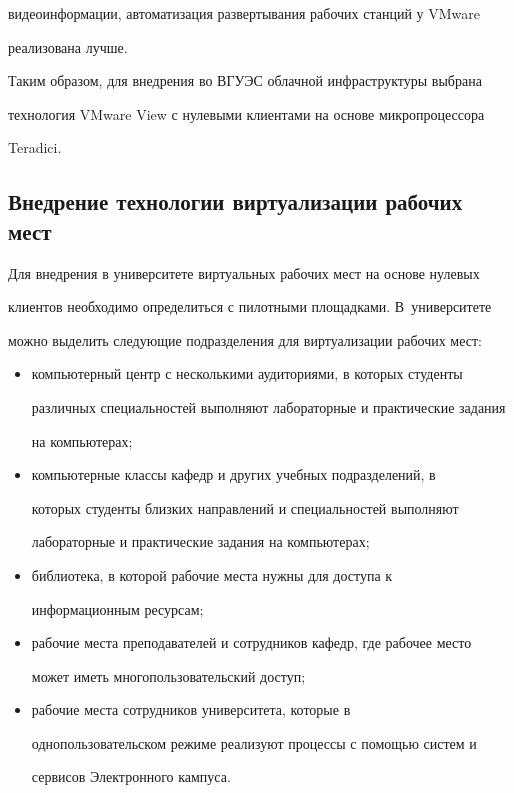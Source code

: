 видеоинформации, автоматизация развертывания рабочих станций у VMware 

реализована лучше. 

  

  Таким образом, для внедрения во ВГУЭС облачной инфраструктуры выбрана 

технология VMware View с нулевыми клиентами на основе микропроцессора 

Teradici. 



\subsection{Внедрение технологии виртуализации рабочих мест }



  Для внедрения в университете виртуальных рабочих мест на основе нулевых 

клиентов необходимо определиться с пилотными площадками. В~университете 

можно выделить следующие подразделения для виртуализации рабочих мест: 

  \begin{itemize}

\item компьютерный центр с несколькими аудиториями, в которых студенты 

различных специальностей выполняют лабораторные и практические задания 

на компьютерах;

\item компьютерные классы кафедр и других учебных подразделений, в 

которых студенты близких направлений и специальностей выполняют 

лабораторные и практические задания на компьютерах;

\item библиотека, в которой рабочие места нужны для доступа к 

информационным ресурсам;

\item рабочие места преподавателей и сотрудников кафедр, где рабочее место 

может иметь многопользовательский доступ;

\item рабочие места сотрудников университета, которые в 

однопользовательском режиме реализуют процессы с помощью систем и 

сервисов Электронного кампуса. 

\end{itemize}

